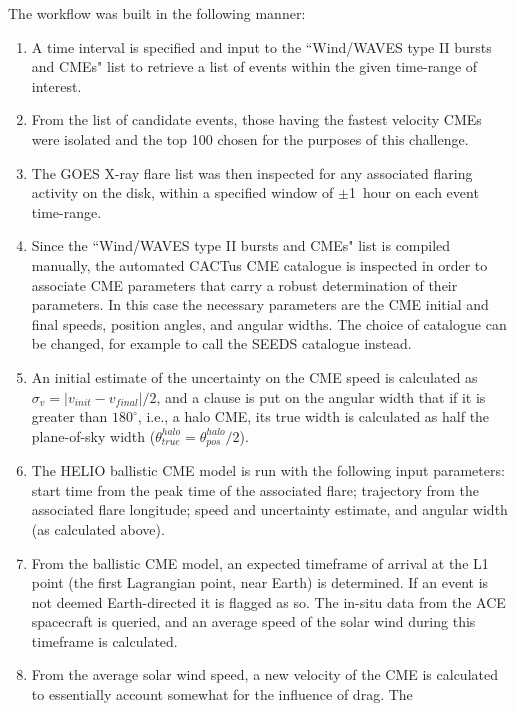 \documentclass[namedreferences]{SolarPhysics}
\begin{document}
\begin{article}
The workflow was built in the following manner:

\begin{enumerate}

\item A time interval is specified and input to the ``Wind/WAVES type II bursts and CMEs" list to retrieve a list of events within the given time-range of interest.

\item From the list of candidate events, those having the fastest velocity CMEs were isolated and the top 100 chosen for the purposes of this challenge.

\item The GOES X-ray flare list was then inspected for any associated flaring activity on the disk, within a specified window of $\pm$1~hour on each event time-range.

\item Since the ``Wind/WAVES type II bursts and CMEs" list is compiled manually, the automated CACTus CME catalogue is inspected in order to associate CME parameters that carry a robust determination of their parameters. In this case the necessary parameters are the CME initial and final speeds, position angles, and angular widths. The choice of catalogue can be changed, for example to call the SEEDS catalogue instead.

\item An initial estimate of the uncertainty on the CME speed is calculated as $\sigma_v=|v_{init}-v_{final}|/2$, and a clause is put on the angular width that if it is greater than $180^{\circ}$, i.e., a halo CME, its true width is calculated as half the plane-of-sky width ($\theta^{halo}_{true}=\theta^{halo}_{pos}/2$).

\item The HELIO ballistic CME model is run with the following input parameters: start time from the peak time of the associated flare; trajectory from the associated flare longitude; speed and uncertainty estimate, and angular width (as calculated above).

\item From the ballistic CME model, an expected timeframe of arrival at the L1 point (the first Lagrangian point, near Earth) is determined. If an event is not deemed Earth-directed it is flagged as so. The in-situ data from the ACE spacecraft is queried, and an average speed of the solar wind during this timeframe is calculated. 

\item From the average solar wind speed, a new velocity of the CME is calculated to essentially account somewhat for the influence of drag. The 




\end{enumerate}
\end{article}
\end{document}
